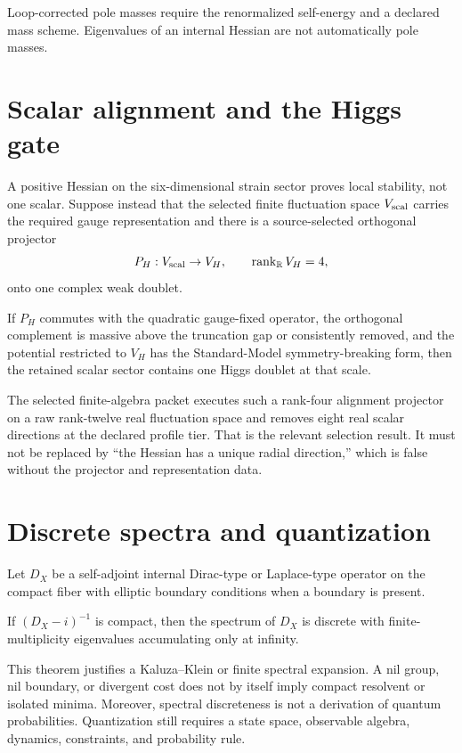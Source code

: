 \documentclass[11pt]{article}
\begin{document}
Loop-corrected pole masses require the renormalized self-energy and a declared
mass scheme.  Eigenvalues of an internal Hessian are not automatically pole
masses.

\section{Scalar alignment and the Higgs gate}

A positive Hessian on the six-dimensional strain sector proves local
stability, not one scalar.  Suppose instead that the selected finite
fluctuation space $V_{\rm scal}$ carries the required gauge representation and
there is a source-selected orthogonal projector
\[
 P_H:V_{\rm scal}\to V_H,
 \qquad \operatorname{rank}_{\mathbb R}V_H=4,
\]
onto one complex weak doublet.

\begin{proposition}
If $P_H$ commutes with the quadratic gauge-fixed operator, the orthogonal
complement is massive above the truncation gap or consistently removed, and
the potential restricted to $V_H$ has the Standard-Model symmetry-breaking
form, then the retained scalar sector contains one Higgs doublet at that
scale.
\end{proposition}

The selected finite-algebra packet executes such a rank-four alignment
projector on a raw rank-twelve real fluctuation space and removes eight real
scalar directions at the declared profile tier.  That is the relevant
selection result.  It must not be replaced by ``the Hessian has a unique
radial direction,'' which is false without the projector and representation
data.

\section{Discrete spectra and quantization}

Let $D_X$ be a self-adjoint internal Dirac-type or Laplace-type operator on the
compact fiber with elliptic boundary conditions when a boundary is present.

\begin{theorem}
If $(D_X-i)^{-1}$ is compact, then the spectrum of $D_X$ is discrete with
finite-multiplicity eigenvalues accumulating only at infinity.
\end{theorem}

This theorem justifies a Kaluza--Klein or finite spectral expansion.  A nil
group, nil boundary, or divergent cost does not by itself imply compact
resolvent or isolated minima.  Moreover, spectral discreteness is not a
derivation of quantum probabilities.  Quantization still requires a state
space, observable algebra, dynamics, constraints, and probability rule.
\end{document}
